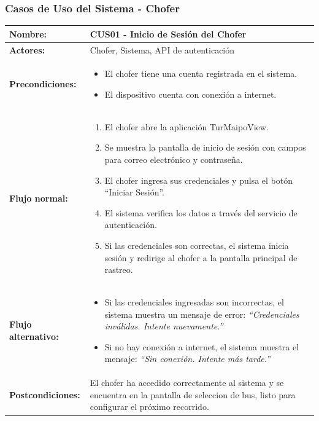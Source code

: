 \documentclass[12pt]{article}
\begin{document}
\subsubsection{Casos de Uso del Sistema - Chofer}
    \begin{table}[!h]
    \centering
    \begin{tabular}{|p{3.5cm}|p{11cm}|}
    \hline
    \textbf{Nombre:} & CUS01 - Inicio de Sesión del Chofer \\
    \hline
    \textbf{Actores:} & Chofer, Sistema, API de autenticación \\
    \hline
    \textbf{Precondiciones:} &
    \begin{itemize}
        \item El chofer tiene una cuenta registrada en el sistema.
        \item El dispositivo cuenta con conexión a internet.
    \end{itemize}
    \\
    \hline
    \textbf{Flujo normal:} &
    \begin{enumerate}
        \item El chofer abre la aplicación TurMaipoView.
        \item Se muestra la pantalla de inicio de sesión con campos para correo electrónico y contraseña.
        \item El chofer ingresa sus credenciales y pulsa el botón “Iniciar Sesión”.
        \item El sistema verifica los datos a través del servicio de autenticación.
        \item Si las credenciales son correctas, el sistema inicia sesión y redirige al chofer a la pantalla principal de rastreo.
    \end{enumerate}
    \\
    \hline
    \textbf{Flujo alternativo:} &
    \begin{itemize}
        \item[3a.] Si las credenciales ingresadas son incorrectas, el sistema muestra un mensaje de error: \textit{“Credenciales inválidas. Intente nuevamente.”}
        \item[3b.] Si no hay conexión a internet, el sistema muestra el mensaje: \textit{“Sin conexión. Intente más tarde.”}
    \end{itemize}
    \\
    \hline
    \textbf{Postcondiciones:} &
    El chofer ha accedido correctamente al sistema y se encuentra en la pantalla de seleccion de bus, listo para configurar el próximo recorrido.
    \\
    \hline
    \end{tabular}
    \end{table}
\end{document}
